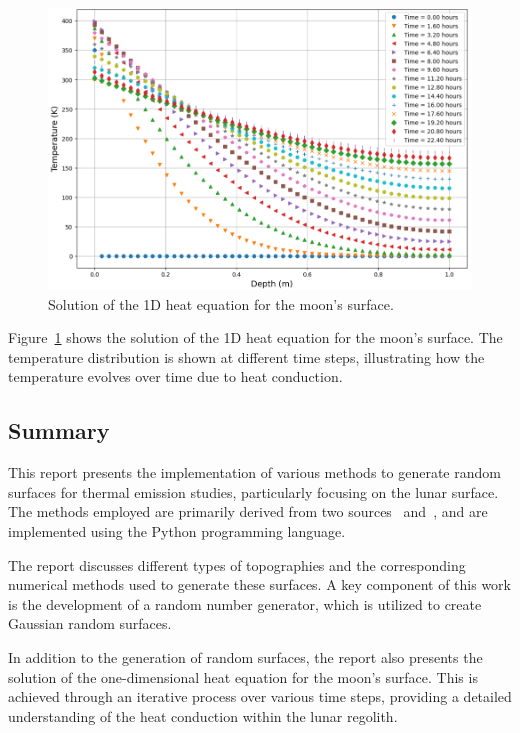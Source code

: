 \documentclass{optica-article}
\begin{document}
\begin{figure}[H]
	\centering
	\includegraphics[scale=0.35]{./Figures/heat_eq.png}
	\caption{Solution of the 1D heat equation for the moon's surface.}
	\label{fig:heat_eq}
\end{figure}

Figure~\ref{fig:heat_eq} shows the solution of the 1D heat equation for the moon's surface. 
The temperature distribution is shown at different time steps, illustrating how the temperature 
evolves over time due to heat conduction.

\subsection{Summary}

This report presents the implementation of various methods to generate random surfaces for 
thermal emission studies, particularly focusing on the lunar surface. 
The methods employed are primarily 
derived from two sources~\cite{WOHLER2017118} and~\cite{DAVIDSSON20151}, 
and are implemented using the Python programming language. 

The report discusses different types of topographies 
and the corresponding numerical methods used to generate these surfaces. 
A key component of this work is the development of a random number generator, 
which is utilized to create Gaussian random surfaces. 

In addition to the generation of random surfaces, 
the report also presents the solution of the one-dimensional heat equation for the 
moon's surface. This is achieved through an iterative process over various time steps, 
providing a detailed understanding of the heat conduction within the lunar regolith.
\end{document}
